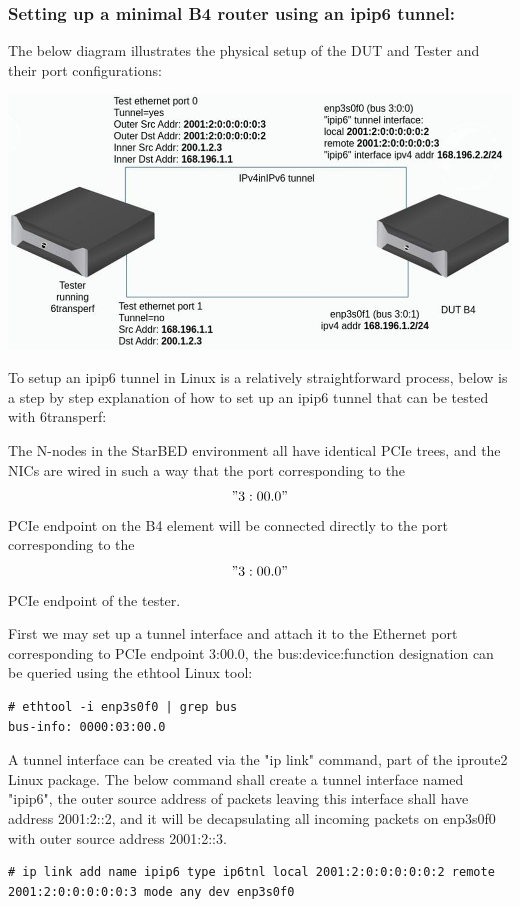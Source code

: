 \documentclass[a4paper,12p]{article}
\begin{document}
\subsubsection{Setting up a minimal B4 router using an ipip6 tunnel:}

The below diagram illustrates the physical setup of the DUT and Tester and their port configurations:

\includegraphics[width=\textwidth]{minimal}

To setup an ipip6 tunnel in Linux is a relatively straightforward process, below is a step by step explanation of how to set up an ipip6 tunnel that can be tested with 6transperf:

The N-nodes in the StarBED environment all have identical PCIe trees, and the NICs are wired in such a way that the port corresponding to the $$"3:00.0"$$ PCIe endpoint on the B4 element will be connected directly to the port corresponding to the $$"3:00.0"$$ PCIe endpoint of the tester.

First we may set up a tunnel interface and attach it to the Ethernet port corresponding to PCIe endpoint 3:00.0, the bus:device:function designation can be queried using the ethtool Linux tool:

\begin{lstlisting}
# ethtool -i enp3s0f0 | grep bus
bus-info: 0000:03:00.0
\end{lstlisting}


A tunnel interface can be created via the "ip link" command, part of the iproute2 Linux package. The below command shall create a tunnel interface named "ipip6", the outer source address of packets leaving this interface shall have address 2001:2::2, and it will be decapsulating all incoming packets on enp3s0f0 with outer source address 2001:2::3.

\begin{lstlisting}
# ip link add name ipip6 type ip6tnl local 2001:2:0:0:0:0:0:2 remote 2001:2:0:0:0:0:0:3 mode any dev enp3s0f0
\end{lstlisting}
\end{document}
